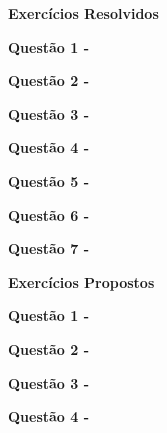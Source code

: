 \textbf{Exercícios Resolvidos}

    \vspace{0.5cm}\textbf{Questão 1 -}
    
    
     
    \vspace{0.5cm}\textbf{Questão 2 -}
    
    
    
    \vspace{0.5cm}\textbf{Questão 3 -}
    
    
    
    \vspace{0.5cm}\textbf{Questão 4 -}
    
    
    
    \vspace{0.5cm}\textbf{Questão 5 -}
    
    
    
    \vspace{0.5cm}\textbf{Questão 6 -}
    
    
    
    \vspace{0.5cm}\textbf{Questão 7 -}
    
    
\textbf{Exercícios Propostos}

    \vspace{0.5cm}\textbf{Questão 1 -}
    
    \vspace{0.5cm}\textbf{Questão 2 -}
    
    \vspace{0.5cm}\textbf{Questão 3 -}
  
    \vspace{0.5cm}\textbf{Questão 4 -}
    
